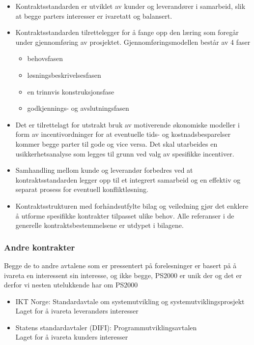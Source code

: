 \documentclass[11pt]{article}
\begin{document}
\begin{itemize}
\item Kontraktsstandarden er utviklet av kunder og leverandører i samarbeid, 
     slik at begge parters interesser er ivaretatt og balansert.
\item Kontraktsstandarden tilrettelegger for å fange opp den læring som foregår under gjennomføring av prosjektet. 
     Gjennomføringsmodellen består av 4 faser

\begin{itemize}
\item behovsfasen
\item løsningsbeskrivelsesfasen
\item en trinnvis konstruksjonsfase
\item godkjennings- og avslutningsfasen
\end{itemize}

\item Det er tilrettelagt for utstrakt bruk av motiverende økonomiske modeller i form av incentivordninger
     for at eventuelle tids- og kostnadsbesparelser kommer begge parter til gode og vice versa. 
     Det skal utarbeides en usikkerhetsanalyse som legges til grunn ved valg av spesifikke incentiver.
\item Samhandling mellom kunde og leverandør forbedres 
     ved at kontraktsstandarden legger opp til et integrert samarbeid 
     og en effektiv og separat prosess for eventuell konfliktløsning.
\item Kontraktsstrukturen med forhåndsutfylte bilag og veiledning gjør det enklere å utforme spesifikke kontrakter tilpasset ulike behov. 
     Alle referanser i de generelle kontraktsbestemmelsene er utdypet i bilagene.
\end{itemize}
\subsubsection{Andre kontrakter}
\label{sec-12.3.1}

    
    Begge de to andre avtalene som er pressentert på forelesninger er basert
    på å ivareta en interessent sin interesse, og ikke begge, PS2000 er unik der
    og det er derfor vi nesten utelukkende har om PS2000
\begin{itemize}

\item IKT Norge: Standardavtale om systemutvikling og systemutviklingsprosjekt\\
\label{sec-12.3.1.1}%
Laget for å ivareta leverandørs interesser

\item Statens standardavtaler (DIFI): Programmutviklingsavtalen\\
\label{sec-12.3.1.2}%
Laget for å ivareta kunders interesser

\end{itemize} %
\end{document}
